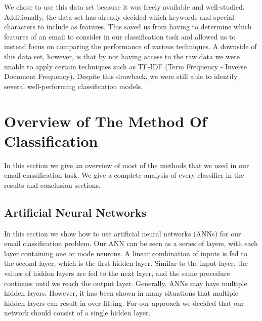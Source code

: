 \documentclass[11pt,oneside,reqno]{amsart}
\theoremstyle{definition}
\theoremstyle{definition}
\theoremstyle{remark}
\numberwithin{equation}{section}
\numberwithin{equation}{section}
\begin{document}
We chose to use this data set because it was freely available and well-studied. Additionally, the data set has already decided which keywords and special characters to include as features. This saved us from having to determine which features of an email to consider in our classification task and allowed us to instead focus on comparing the performance of various techniques. A downside of this data set, however, is that by not having access to the raw data we were unable to apply certain techniques such as TF-IDF (Term Frequency - Inverse Document Frequency). Despite this drawback, we were still able to identify several well-performing classification models.


\section{Overview of The Method Of Classification}
In this section we give an overview of most of the methods that we used in our email classification task. We give a complete analysis of every classifier in the results and conclusion sections.
\subsection{Artificial Neural Networks}

In this section we show how to use artificial neural networks (ANNs) for our email classification problem. Our ANN can be seen as a series of layers, with each layer containing one or mode neurons. A linear combination of inputs is fed to the second layer, which is the first hidden layer. Similar to the input layer, the values of hidden layers are fed to the next layer, and the same procedure continues until we reach the output layer. Generally, ANNs may have multiple hidden layers. However, it has been shown in many situations that multiple hidden layers can result in over-fitting. For our approach we decided that our network should consist of a single hidden layer.
\end{document}
